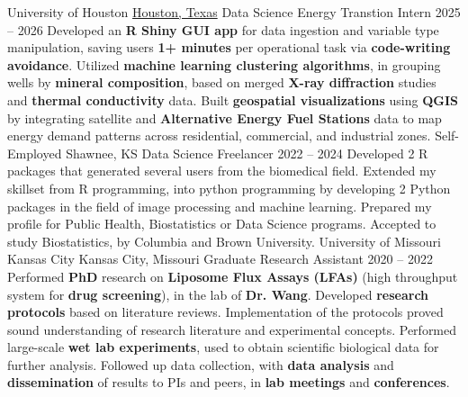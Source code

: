\documentclass[9pt]{adeckcv} %
\begin{document}

\begin{entrylist}
    \entry
        {\large{University of Houston}} 
        {\href{https://www.google.com/maps/place/Philip+Guthrie+Hoffman+Hall,+3551+Cullen+Blvd+\#641,+Houston,+TX+77004/@29.7215903,-95.3462249,17z/data=!3m1!4b1!4m5!3m4!1s0x8640be50d2117d7f:0x5d56023822a527e4!8m2!3d29.7215903!4d-95.34365?entry=ttu\&g_ep=EgoyMDI2MDkxNi4wIKXMDSoASAFQAw\%3D\%3D}{Houston, Texas}}
        {\large{Data Science Energy Transtion Intern}}
        {2025 -- 2026}
        {\itemizeexperience
        {Developed an \textbf{R Shiny GUI app} for data ingestion and variable type manipulation, saving users \textbf{1+ minutes} per operational task via \textbf{code-writing avoidance}.}
        {Utilized \textbf{machine learning clustering algorithms}, in grouping wells by \textbf{mineral composition}, based on merged \textbf{X-ray diffraction} studies and \textbf{thermal conductivity} data.}
        {Built \textbf{geospatial visualizations} using \textbf{QGIS} by integrating satellite and \textbf{Alternative Energy Fuel Stations} data to map energy demand patterns across residential, commercial, and industrial zones.}
\faWindows\slashsep 
\faLinux\slashsep
\faApple{}\slashsep
{}\slashsep
\faPython{}\slashsep
}
\entry
{\large{Self-Employed}}
{Shawnee, KS}
{\large{Data Science Freelancer}}
{2022 -- 2024}
{\itemizeexperience
  {Developed 2 R packages that generated several users from the biomedical field.}
  {Extended my skillset from R programming, into python programming by developing 2 Python packages in the field of image processing and machine learning.}
  {Prepared my profile for Public Health, Biostatistics or Data Science programs. Accepted to study Biostatistics, by Columbia and Brown University.}
  \faAmazon\slashsep
  \faWarehouse\slashsep
  \faBox{}\slashsep
  \faDolly{}\slashsep
  \faTruck{}
}
\entry
{\large{University of Missouri Kansas City}}
{Kansas City, Missouri}
{\large{Graduate Research Assistant}}
{2020 -- 2022}
{\itemizeexperience
  {Performed \textbf{PhD} research on \textbf{Liposome Flux Assays (LFAs)} (high throughput system for \textbf{drug screening}), in the lab of \textbf{Dr. Wang}.}
  {Developed \textbf{research protocols} based on literature reviews. Implementation of the protocols proved sound understanding of research literature and experimental concepts.}
  {Performed large-scale \textbf{wet lab experiments}, used to obtain scientific biological data for further analysis. Followed up data collection, with \textbf{data analysis} and \textbf{dissemination} of results to PIs and peers, in \textbf{lab meetings} and \textbf{conferences}.}
  \faDna\slashsep
  \faFlask{}\slashsep
  \faPills{}\slashsep
  \faSlideshare
}
\end{entrylist}
\end{document}
